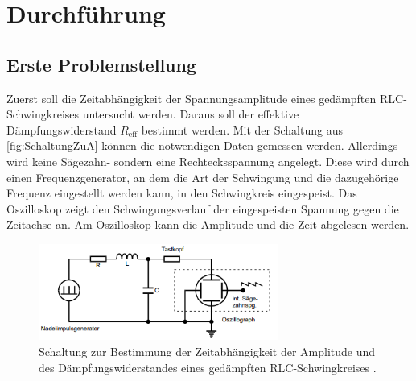 \section{Durchführung}
\label{sec:Durchfuehrung}
\subsection{Erste Problemstellung}
Zuerst soll die Zeitabhängigkeit der Spannungsamplitude eines gedämpften RLC-Schwingkreises untersucht werden. Daraus soll der effektive Dämpfungswiderstand $R_{\text{eff}}$ bestimmt
werden. Mit der Schaltung aus \autoref{fig:SchaltungZuA} können die notwendigen Daten gemessen werden. Allerdings wird keine Sägezahn- sondern eine Rechtecksspannung angelegt. 
Diese wird durch einen Frequenzgenerator, an dem die Art der Schwingung und die dazugehörige Frequenz eingestellt werden kann, in den Schwingkreis 
eingespeist. Das Oszilloskop zeigt den Schwingungsverlauf der eingespeisten Spannung gegen die Zeitachse an. Am Oszilloskop kann die Amplitude und die Zeit abgelesen werden.
\begin{figure}
    \includegraphics[width=0.7\textwidth]{content/SchaltungZuA.pdf}
    \centering
    \caption{Schaltung zur Bestimmung der Zeitabhängigkeit der Amplitude und des Dämpfungswiderstandes eines gedämpften RLC-Schwingkreises \cite{v354}.}
    \label{fig:SchaltungZuA}
\end{figure}
